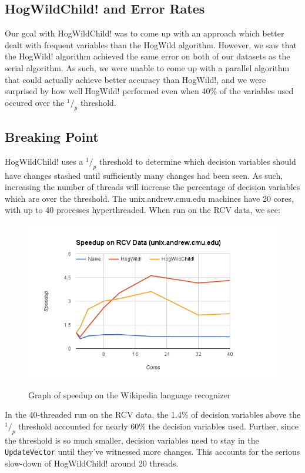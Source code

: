 \documentclass{article}
\newcommand*\rfrac[2]{{}^{#1}\!/_{#2}}
\begin{document}
\subsection{HogWildChild! and Error Rates}

Our goal with HogWildChild! was to come up with an approach which better
dealt with frequent variables than the HogWild algorithm.
However, we saw that the HogWild! algorithm achieved the same error on
both of our datasets as the serial algorithm.
As such, we were unable to come up with a parallel algorithm that could
actually achieve better accuracy than HogWild!, and we were surprised by
how well HogWild! performed even when 40\% of the variables used occured
over the $\rfrac 1 p$ threshold.

\subsection{Breaking Point}

HogWildChild! uses a $\rfrac 1 p$ threshold to determine which decision
variables should have changes stashed until sufficiently many changes had
been seen.
As such, increasing the number of threads will increase the percentage of
decision variables which are over the threshold.
The unix.andrew.cmu.edu machines have 20 cores, with up to 40 processes
hyperthreaded.
When run on the RCV data, we see:

\begin{figure}[h!]
\centering
\includegraphics[width=\textwidth]{img/unix_graph.png}
\label{unix-rcv}
\caption{Graph of speedup on the Wikipedia language recognizer}
\end{figure}

In the 40-threaded run on the RCV data, the 1.4\% of decision variables
above the $\rfrac 1 p$ threshold accounted for nearly 60\%
the decision variables used.
Further, since the threshold is so much smaller, decision variables need to
stay in the \texttt{UpdateVector} until they've witnessed more changes.
This accounts for the serious slow-down of HogWildChild! around 20 threads.
\end{document}
